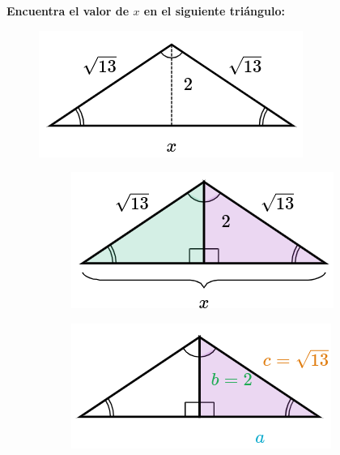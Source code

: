 \begin{multicols}{2}
    \textbf{Encuentra el valor de $x$ en el siguiente triángulo:}

    \begin{figure}[H]
        \centering
        \includegraphics[width=0.45\linewidth]{../images/pitagoras10.png}
    \end{figure}
\end{multicols}\vspace{-0.5cm}
\begin{solutionbox}{7cm}\footnotesize
    \captionsetup[wrapfigure]{size=scriptsize,justification=centering}
    \begin{figure}
        \centering
        \captionsetup[subfigure]{size=scriptsize}
        \begin{subfigure}{0.9\linewidth}
            \includegraphics[width=\linewidth]{../images/pitagoras10a.png}
            \caption{}
            \label{subfig:pitagoras10a}
        \end{subfigure}
        \begin{subfigure}{0.9\linewidth}
            \includegraphics[width=\linewidth]{../images/pitagoras10b.png}

\end{subfigure}
\end{figure}
\end{solutionbox}
